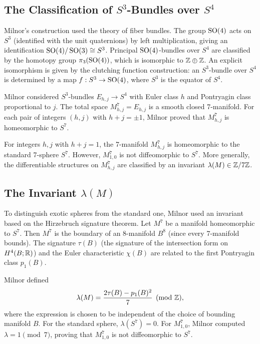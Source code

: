 \subsection{The Classification of \texorpdfstring{\(S^3\)}{S 3}-Bundles over \texorpdfstring{\(S^4\)}{S 4}}

Milnor's construction used the theory of fiber bundles. The group \(\operatorname{SO}(4)\) acts on \(S^3\) (identified with the unit quaternions) by left multiplication, giving an identification \(\operatorname{SO}(4)/\operatorname{SO}(3) \cong S^3\). Principal \(\operatorname{SO}(4)\)-bundles over \(S^4\) are classified by the homotopy group \(\pi_3(\operatorname{SO}(4))\), which is isomorphic to \(\mathbb{Z} \oplus \mathbb{Z}\). An explicit isomorphism is given by the clutching function construction: an \(S^3\)-bundle over \(S^4\) is determined by a map \(f: S^3 \to \operatorname{SO}(4)\), where \(S^3\) is the equator of \(S^4\).

Milnor considered \(S^3\)-bundles \(E_{h,j} \to S^4\) with Euler class \(h\) and Pontryagin class proportional to \(j\). The total space \(M^7_{h,j} = E_{h,j}\) is a smooth closed 7-manifold. For each pair of integers \((h,j)\) with \(h + j = \pm 1\), Milnor proved that \(M^7_{h,j}\) is homeomorphic to \(S^7\).

\begin{theorem}[Milnor, 1956]
For integers \(h,j\) with \(h + j = 1\), the 7-manifold \(M^7_{h,j}\) is homeomorphic to the standard 7-sphere \(S^7\). However, \(M^7_{1,0}\) is not diffeomorphic to \(S^7\). More generally, the differentiable structures on \(M^7_{h,j}\) are classified by an invariant \(\lambda(M) \in \mathbb{Z}/7\mathbb{Z}\).
\end{theorem}

\subsection{The Invariant \texorpdfstring{\(\lambda(M)\)}{lambda(M)}}

To distinguish exotic spheres from the standard one, Milnor used an invariant based on the Hirzebruch signature theorem. Let \(M^7\) be a manifold homeomorphic to \(S^7\). Then \(M^7\) is the boundary of an 8-manifold \(B^8\) (since every 7-manifold bounds). The signature \(\tau(B)\) (the signature of the intersection form on \(H^4(B; \mathbb{R})\)) and the Euler characteristic \(\chi(B)\) are related to the first Pontryagin class \(p_1(B)\).

Milnor defined
\[
\lambda(M) = \frac{2\tau(B) - p_1(B)^2}{7} \pmod{\mathbb{Z}},
\]
where the expression is chosen to be independent of the choice of bounding manifold \(B\). For the standard sphere, \(\lambda(S^7) = 0\). For \(M^7_{1,0}\), Milnor computed \(\lambda = 1 \pmod{7}\), proving that \(M^7_{1,0}\) is not diffeomorphic to \(S^7\).

